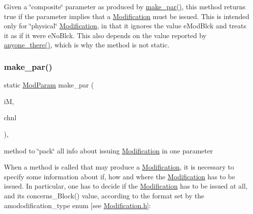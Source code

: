 Given a \char`\"{}composite\char`\"{} parameter as produced by \mbox{\hyperlink{class_s_m_spp__di__unipi__it_1_1_observer_a2d499ae38e5e95cf66cd71da32b0694a}{make\+\_\+par()}}, this method returns true if the parameter implies that a \mbox{\hyperlink{class_s_m_spp__di__unipi__it_1_1_modification}{Modification}} must be issued. This is intended only for \char`\"{}physical\char`\"{} \mbox{\hyperlink{class_s_m_spp__di__unipi__it_1_1_modification}{Modification}}, in that it ignores the value e\+Mod\+Blck and treats it as if it were e\+No\+Blck. This also depends on the value reported by \mbox{\hyperlink{class_s_m_spp__di__unipi__it_1_1_observer_a7d8dd42bea99dfdb6fb967ba17993560}{anyone\+\_\+there()}}, which is why the method is not static. \mbox{\label{class_s_m_spp__di__unipi__it_1_1_observer_a2d499ae38e5e95cf66cd71da32b0694a}} 
\subsubsection{\texorpdfstring{make\+\_\+par()}{make\_par()}}
{\footnotesize\ttfamily static \mbox{\hyperlink{group___modification___t_y_p_e_s_gac8fdf1a69f314970b9aaa9328e3f3907}{Mod\+Param}} make\+\_\+par (\begin{DoxyParamCaption}\item[{\mbox{\hyperlink{group___modification___t_y_p_e_s_ga544246d8c462e9a2d817c2c30797968f}{c\+\_\+\+Mod\+Param}}}]{iM,  }\item[{\mbox{\hyperlink{class_s_m_spp__di__unipi__it_1_1_observer_aa9ad8de42ffaf90023bfed5c085ad8bc}{c\+\_\+\+Chnl\+Name}}}]{chnl }\end{DoxyParamCaption})\hspace{0.3cm}{\ttfamily [inline]}, {\ttfamily [static]}}



method to \char`\"{}pack\char`\"{} all info about issuing \mbox{\hyperlink{class_s_m_spp__di__unipi__it_1_1_modification}{Modification}} in one parameter 

When a method is called that may produce a \mbox{\hyperlink{class_s_m_spp__di__unipi__it_1_1_modification}{Modification}}, it is necessary to specify some information about if, how and where the \mbox{\hyperlink{class_s_m_spp__di__unipi__it_1_1_modification}{Modification}} has to be issued. In particular, one has to decide if the \mbox{\hyperlink{class_s_m_spp__di__unipi__it_1_1_modification}{Modification}} has to be issued at all, and its concerns\+\_\+\+Block() value, according to the format set by the amododification\+\_\+type enum \mbox{[}see \mbox{\hyperlink{_modification_8h}{Modification.\+h}}\mbox{]}\+:


